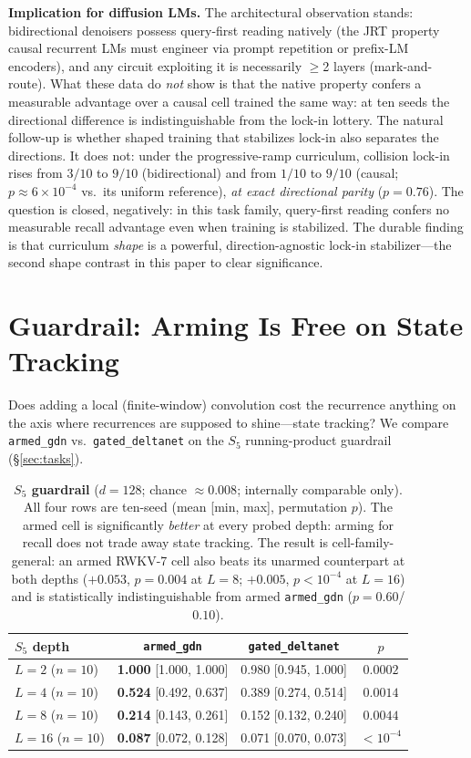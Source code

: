 \documentclass{article}
\newcommand{\armed}{\texttt{armed\_gdn}}
\newcommand{\gdn}{\texttt{gated\_deltanet}}
\begin{document}
\textbf{Implication for diffusion LMs.} The architectural observation stands: bidirectional denoisers possess query-first reading natively (the JRT property causal recurrent LMs must engineer via prompt repetition or prefix-LM encoders), and any circuit exploiting it is necessarily $\ge$2 layers (mark-and-route). What these data do \emph{not} show is that the native property confers a measurable advantage over a causal cell trained the same way: at ten seeds the directional difference is indistinguishable from the lock-in lottery. The natural follow-up is whether shaped training that stabilizes lock-in also separates the directions. It does not: under the progressive-ramp curriculum, collision lock-in rises from $3/10$ to $9/10$ (bidirectional) and from $1/10$ to $9/10$ (causal; $p{\approx}6{\times}10^{-4}$ vs.\ its uniform reference), \emph{at exact directional parity} ($p{=}0.76$). The question is closed, negatively: in this task family, query-first reading confers no measurable recall advantage even when training is stabilized. The durable finding is that curriculum \emph{shape} is a powerful, direction-agnostic lock-in stabilizer---the second shape contrast in this paper to clear significance.

\section{Guardrail: Arming Is Free on State Tracking}\label{sec:guardrail}

Does adding a local (finite-window) convolution cost the recurrence anything on the axis where recurrences are supposed to shine---state tracking? We compare \armed{} vs.\ \gdn{} on the $S_5$ running-product guardrail (\S\ref{sec:tasks}).

\begin{table}[t]
\centering
\caption{\textbf{$S_5$ guardrail} ($d{=}128$; chance $\approx 0.008$; internally comparable only). All four rows are ten-seed (mean [min, max], permutation $p$). The armed cell is significantly \emph{better} at every probed depth: arming for recall does not trade away state tracking. The result is cell-family-general: an armed RWKV-7 cell also beats its unarmed counterpart at both depths ($+0.053$, $p{=}0.004$ at $L{=}8$; $+0.005$, $p{<}10^{-4}$ at $L{=}16$) and is statistically indistinguishable from armed \armed{} ($p{=}0.60$/$0.10$).}
\label{tab:s5}
\vskip 0.1in
\footnotesize
\setlength{\tabcolsep}{3.5pt}
\begin{tabular}{lccc}
\toprule
$S_5$ depth & \armed{} & \gdn{} & $p$ \\
\midrule
$L{=}2$ ($n{=}10$) & \textbf{1.000} [1.000, 1.000] & 0.980 [0.945, 1.000] & $0.0002$ \\
$L{=}4$ ($n{=}10$) & \textbf{0.524} [0.492, 0.637] & 0.389 [0.274, 0.514] & $0.0014$ \\
$L{=}8$ ($n{=}10$) & \textbf{0.214} [0.143, 0.261] & 0.152 [0.132, 0.240] & $0.0044$ \\
$L{=}16$ ($n{=}10$) & \textbf{0.087} [0.072, 0.128] & 0.071 [0.070, 0.073] & $<10^{-4}$ \\
\bottomrule
\end{tabular}
\end{table}
\end{document}
